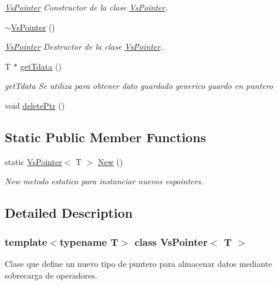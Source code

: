 \begin{DoxyCompactItemize}
\begin{DoxyCompactList}\small\item\em \hyperlink{class_vs_pointer}{Vs\+Pointer} Constructor de la clase \hyperlink{class_vs_pointer}{Vs\+Pointer}. \end{DoxyCompactList}\item 
\hyperlink{class_vs_pointer_a10c30d26192226abb265366456986eb4}{$\sim$\+Vs\+Pointer} ()
\begin{DoxyCompactList}\small\item\em \hyperlink{class_vs_pointer}{Vs\+Pointer} Destructor de la clase \hyperlink{class_vs_pointer}{Vs\+Pointer}. \end{DoxyCompactList}\item 
T $\ast$ \hyperlink{class_vs_pointer_a7460c0d67fdbb0611769d83af012bb6f}{get\+Tdata} ()
\begin{DoxyCompactList}\small\item\em get\+Tdata Se utiliza para obtener dato guardado generico guardo en puntero \end{DoxyCompactList}\item 
void \hyperlink{class_vs_pointer_a98bcbff767bf90817c4122639cffb227}{delete\+Ptr} ()
\end{DoxyCompactItemize}
\subsection*{Static Public Member Functions}
\begin{DoxyCompactItemize}
\item 
static \hyperlink{class_vs_pointer}{Vs\+Pointer}$<$ T $>$ \hyperlink{class_vs_pointer_a8ae882f2a0ca90b0c586f79d8c7e3fdc}{New} ()
\begin{DoxyCompactList}\small\item\em New metodo estatico para instanciar nuevos vspointers. \end{DoxyCompactList}\end{DoxyCompactItemize}


\subsection{Detailed Description}
\subsubsection*{template$<$typename T$>$\newline
class Vs\+Pointer$<$ T $>$}

Clase que define un nuevo tipo de puntero para almacenar datos mediante sobrecarga de operadores. 

